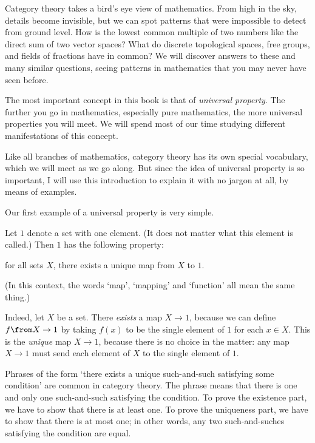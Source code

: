Category theory takes a bird's eye view of mathematics.  From high in the sky,
details become invisible, but we can spot patterns that were impossible to
detect from ground level.  How is the lowest common multiple of two numbers
like the direct sum of two vector spaces?  What do discrete topological
spaces, free groups, and fields of fractions have in common?  We will
discover answers to these and many similar questions, seeing patterns in
mathematics that you may never have seen before.

The most important concept in this book is that of \emph{universal%
%
%
property}.  The further you go in mathematics, especially pure mathematics,
the more universal properties you will meet.  We will spend most of our
time studying different manifestations of this concept.

Like all branches of mathematics, category theory has its own special
vocabulary, which we will meet as we go along.  But since the idea of
universal property is so important, I will use this introduction to explain
it with no jargon at all, by means of examples.

Our first example of a universal property is very simple.

\begin{iexample} 
\label{eg:univ-terminal-set}
Let $1$%
%
%
denote a set with one%
%
%
element.  (It does not matter what this element is called.)  Then $1$ has
the following property:
% 
\begin{displaytext}
for all sets $X$, there exists a unique map from $X$ to $1$.
\end{displaytext}
% 
(In this context, the words `map', `mapping' and `function' all mean the
same thing.)

Indeed, let $X$ be a set.  There \emph{exists} a map $X \to 1$, because we
can define $f\from X \to 1$ by taking $f(x)$ to be the single element of
$1$ for each $x \in X$.  This is the \emph{unique} map $X \to 1$, because
there is no choice in the matter: any map $X \to 1$ must send each element
of $X$ to the single element of $1$.
\end{iexample}

Phrases of the form `there exists a unique%
%
% 
such-and-such satisfying some condition' are common in category theory.
The phrase means that there is one and only one such-and-such satisfying
the condition.  To prove the existence part, we have to show that there is
at least one.  To prove the uniqueness part, we have to show that there is
at most one; in other words, any two such-and-suches satisfying the
condition are equal.

